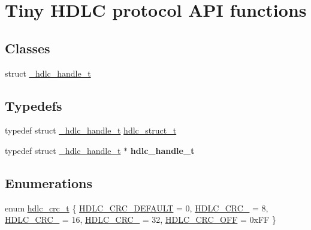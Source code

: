 \hypertarget{group__HDLC__API}{}\section{Tiny H\+D\+LC protocol A\+PI functions}
\label{group__HDLC__API}
\subsection*{Classes}
\begin{DoxyCompactItemize}
\item 
struct \hyperlink{struct__hdlc__handle__t}{\+\_\+hdlc\+\_\+handle\+\_\+t}
\end{DoxyCompactItemize}
\subsection*{Typedefs}
\begin{DoxyCompactItemize}
\item 
typedef struct \hyperlink{struct__hdlc__handle__t}{\+\_\+hdlc\+\_\+handle\+\_\+t} \hyperlink{group__HDLC__API_ga4537a8665b2abe023cb7fe40ea1bd024}{hdlc\+\_\+struct\+\_\+t}
\item 
\mbox{\label{group__HDLC__API_gabeaf7578aed5279d3af891bd85a9f961}} 
typedef struct \hyperlink{struct__hdlc__handle__t}{\+\_\+hdlc\+\_\+handle\+\_\+t} $\ast$ {\bfseries hdlc\+\_\+handle\+\_\+t}
\end{DoxyCompactItemize}
\subsection*{Enumerations}
\begin{DoxyCompactItemize}
\item 
enum \hyperlink{group__HDLC__API_gabb73b32d08d8e79eefe9385634a74bf7}{hdlc\+\_\+crc\+\_\+t} \{ \newline
\hyperlink{group__HDLC__API_ggabb73b32d08d8e79eefe9385634a74bf7a5f34a095f94c39357e31badd2feb9426}{H\+D\+L\+C\+\_\+\+C\+R\+C\+\_\+\+D\+E\+F\+A\+U\+LT} = 0, 
\hyperlink{group__HDLC__API_ggabb73b32d08d8e79eefe9385634a74bf7a01bc9e3bb4df100ae74bd65e33223a10}{H\+D\+L\+C\+\_\+\+C\+R\+C\+\_} = 8, 
\hyperlink{group__HDLC__API_ggabb73b32d08d8e79eefe9385634a74bf7a7ee7be32ac5752572334f3c6bc6fa5a1}{H\+D\+L\+C\+\_\+\+C\+R\+C\+\_} = 16, 
\hyperlink{group__HDLC__API_ggabb73b32d08d8e79eefe9385634a74bf7a77c7dfdc97801651d98b6c4eb79882d3}{H\+D\+L\+C\+\_\+\+C\+R\+C\+\_} = 32, 
\newline
\hyperlink{group__HDLC__API_ggabb73b32d08d8e79eefe9385634a74bf7a6ed874f871614e9de6358d678256a140}{H\+D\+L\+C\+\_\+\+C\+R\+C\+\_\+\+O\+FF} = 0x\+FF
 \}
\end{DoxyCompactItemize}
